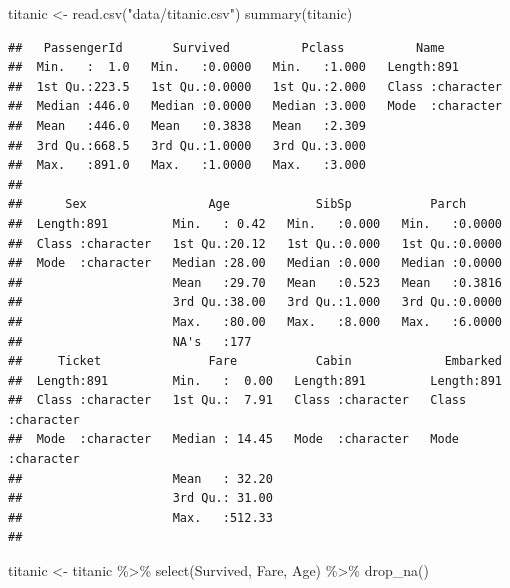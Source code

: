 \documentclass[
  12pt,
]{book}
\newenvironment{Shaded}{\begin{snugshade}}{\end{snugshade}}
\newcommand{\FunctionTok}[1]{\textcolor[rgb]{0.00,0.00,0.00}{#1}}
\newcommand{\NormalTok}[1]{#1}
\newcommand{\OtherTok}[1]{\textcolor[rgb]{0.56,0.35,0.01}{#1}}
\newcommand{\SpecialCharTok}[1]{\textcolor[rgb]{0.00,0.00,0.00}{#1}}
\newcommand{\StringTok}[1]{\textcolor[rgb]{0.31,0.60,0.02}{#1}}
\begin{document}
\begin{Shaded}
\begin{Highlighting}[]
\NormalTok{titanic }\OtherTok{\textless{}{-}} \FunctionTok{read.csv}\NormalTok{(}\StringTok{"data/titanic.csv"}\NormalTok{)}
\FunctionTok{summary}\NormalTok{(titanic)}
\end{Highlighting}
\end{Shaded}

\begin{verbatim}
##   PassengerId       Survived          Pclass          Name          
##  Min.   :  1.0   Min.   :0.0000   Min.   :1.000   Length:891        
##  1st Qu.:223.5   1st Qu.:0.0000   1st Qu.:2.000   Class :character  
##  Median :446.0   Median :0.0000   Median :3.000   Mode  :character  
##  Mean   :446.0   Mean   :0.3838   Mean   :2.309                     
##  3rd Qu.:668.5   3rd Qu.:1.0000   3rd Qu.:3.000                     
##  Max.   :891.0   Max.   :1.0000   Max.   :3.000                     
##                                                                     
##      Sex                 Age            SibSp           Parch       
##  Length:891         Min.   : 0.42   Min.   :0.000   Min.   :0.0000  
##  Class :character   1st Qu.:20.12   1st Qu.:0.000   1st Qu.:0.0000  
##  Mode  :character   Median :28.00   Median :0.000   Median :0.0000  
##                     Mean   :29.70   Mean   :0.523   Mean   :0.3816  
##                     3rd Qu.:38.00   3rd Qu.:1.000   3rd Qu.:0.0000  
##                     Max.   :80.00   Max.   :8.000   Max.   :6.0000  
##                     NA's   :177                                     
##     Ticket               Fare           Cabin             Embarked        
##  Length:891         Min.   :  0.00   Length:891         Length:891        
##  Class :character   1st Qu.:  7.91   Class :character   Class :character  
##  Mode  :character   Median : 14.45   Mode  :character   Mode  :character  
##                     Mean   : 32.20                                        
##                     3rd Qu.: 31.00                                        
##                     Max.   :512.33                                        
## 
\end{verbatim}

\begin{Shaded}
\begin{Highlighting}[]
\NormalTok{titanic }\OtherTok{\textless{}{-}}\NormalTok{ titanic }\SpecialCharTok{\%\textgreater{}\%}
    \FunctionTok{select}\NormalTok{(Survived, Fare, Age) }\SpecialCharTok{\%\textgreater{}\%}
    \FunctionTok{drop\_na}\NormalTok{()}
\end{Highlighting}
\end{Shaded}
\end{document}
